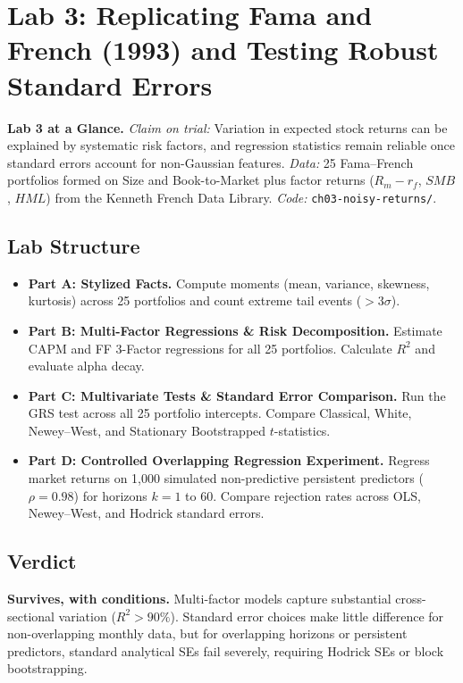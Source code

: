 \section{Lab 3: Replicating Fama and French (1993) and Testing Robust Standard Errors}
\label{sec:03-lab}

\begin{callout}
\noindent \textbf{Lab 3 at a Glance.} \emph{Claim on trial:} Variation in expected stock returns can be explained by systematic risk factors, and regression statistics remain reliable once standard errors account for non-Gaussian features. \emph{Data:} 25 Fama--French portfolios formed on Size and Book-to-Market plus factor returns ($R_m-r_f$, $SMB$, $HML$) from the Kenneth French Data Library. \emph{Code:} \texttt{ch03-noisy-returns/}.
\end{callout}

\subsection*{Lab Structure}
\begin{itemize}
  \item \textbf{Part A: Stylized Facts.} Compute moments (mean, variance, skewness, kurtosis) across 25 portfolios and count extreme tail events ($>3\sigma$).
  \item \textbf{Part B: Multi-Factor Regressions \& Risk Decomposition.} Estimate CAPM and FF 3-Factor regressions for all 25 portfolios. Calculate $R^2$ and evaluate alpha decay.
  \item \textbf{Part C: Multivariate Tests \& Standard Error Comparison.} Run the GRS test across all 25 portfolio intercepts. Compare Classical, White, Newey--West, and Stationary Bootstrapped $t$-statistics.
  \item \textbf{Part D: Controlled Overlapping Regression Experiment.} Regress market returns on 1,000 simulated non-predictive persistent predictors ($\rho=0.98$) for horizons $k=1$ to $60$. Compare rejection rates across OLS, Newey--West, and Hodrick standard errors.
\end{itemize}

\subsection*{Verdict}
\textbf{Survives, with conditions.} Multi-factor models capture substantial cross-sectional variation ($R^2 > 90\%$). Standard error choices make little difference for non-overlapping monthly data, but for overlapping horizons or persistent predictors, standard analytical SEs fail severely, requiring Hodrick SEs or block bootstrapping.
